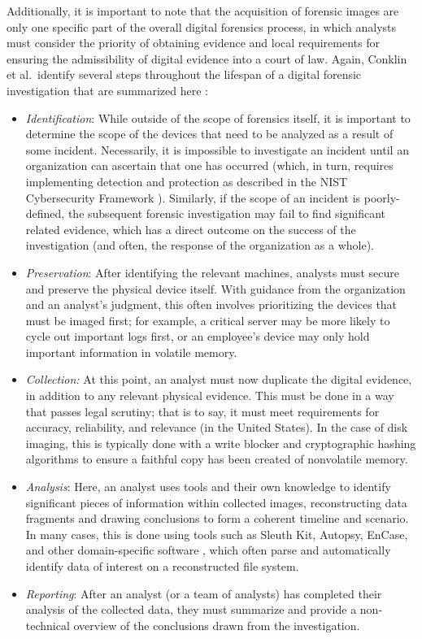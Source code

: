 \documentclass[letterpaper,12pt]{report}
\def\tightlist{}
\begin{document}
Additionally, it is important to note that the acquisition of forensic
images are only one specific part of the overall digital forensics
process, in which analysts must consider the priority of obtaining
evidence and local requirements for ensuring the admissibility of
digital evidence into a court of law. Again, Conklin et al.~identify
several steps throughout the lifespan of a digital forensic
investigation that are summarized here
\cite{conklinComputerForensics2022}:

\begin{itemize}
\tightlist
\item
  \emph{Identification}: While outside of the scope of forensics itself,
  it is important to determine the scope of the devices that need to be
  analyzed as a result of some incident. Necessarily, it is impossible
  to investigate an incident until an organization can ascertain that
  one has occurred (which, in turn, requires implementing detection and
  protection as described in the NIST Cybersecurity Framework
  \cite{nistNISTCybersecurityFramework2023}). Similarly, if the
  scope of an incident is poorly-defined, the subsequent forensic
  investigation may fail to find significant related evidence, which has
  a direct outcome on the success of the investigation (and often, the
  response of the organization as a whole).
\item
  \emph{Preservation}: After identifying the relevant machines, analysts
  must secure and preserve the physical device itself. With guidance
  from the organization and an analyst's judgment, this often involves
  prioritizing the devices that must be imaged first; for example, a
  critical server may be more likely to cycle out important logs first,
  or an employee's device may only hold important information in
  volatile memory.
\item
  \emph{Collection:} At this point, an analyst must now duplicate the
  digital evidence, in addition to any relevant physical evidence. This
  must be done in a way that passes legal scrutiny; that is to say, it
  must meet requirements for accuracy, reliability, and relevance
  \cite{conklinComputerForensics2022,garfinkelBringingScienceDigital2009}
  (in the United States). In the case of disk imaging, this is typically
  done with a write blocker and cryptographic hashing algorithms to
  ensure a faithful copy has been created of nonvolatile memory.
\item
  \emph{Analysis}: Here, an analyst uses tools and their own knowledge
  to identify significant pieces of information within collected images,
  reconstructing data fragments and drawing conclusions to form a
  coherent timeline and scenario. In many cases, this is done using
  tools such as Sleuth Kit, Autopsy, EnCase, and other domain-specific
  software \cite{jonesInsightDigitalForensics2022}, which often
  parse and automatically identify data of interest on a reconstructed
  file system.
\item
  \emph{Reporting}: After an analyst (or a team of analysts) has
  completed their analysis of the collected data, they must summarize
  and provide a non-technical overview of the conclusions drawn from the
  investigation.
\end{itemize}
\end{document}
